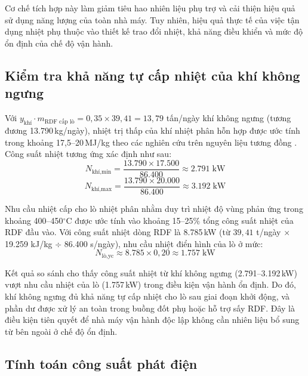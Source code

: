 \documentclass[../main.tex]{subfiles}
\begin{document}
Cơ chế tích hợp này làm giảm tiêu hao nhiên liệu phụ trợ và cải thiện hiệu quả sử dụng năng lượng của toàn nhà máy. Tuy nhiên, hiệu quả thực tế của việc tận dụng nhiệt phụ thuộc vào thiết kế trao đổi nhiệt, khả năng điều khiển và mức độ ổn định của chế độ vận hành.

\subsection{Kiểm tra khả năng tự cấp nhiệt của khí không ngưng}

Với $y_{\text{khí}} \cdot m_{\text{RDF cấp lò}} = 0{,}35 \times 39{,}41 = 13{,}79$ tấn/ngày khí không ngưng (tương đương 13.790\,kg/ngày), nhiệt trị thấp của khí nhiệt phân hỗn hợp được ước tính trong khoảng 17,5--20\,MJ/kg theo các nghiên cứu trên nguyên liệu tương đồng \cite{Williams2007}. Công suất nhiệt tương ứng xác định như sau:
\begin{equation}
  N_{\text{khí,min}} = \frac{13.790 \times 17.500}{86.400} \approx 2.791 \;\text{kW}
\end{equation}
\begin{equation}
  N_{\text{khí,max}} = \frac{13.790 \times 20.000}{86.400} \approx 3.192 \;\text{kW}
\end{equation}

Nhu cầu nhiệt cấp cho lò nhiệt phân nhằm duy trì nhiệt độ vùng phản ứng trong khoảng 400--450$^\circ\mathrm{C}$ được ước tính vào khoảng 15--25\% tổng công suất nhiệt của RDF đầu vào. Với công suất nhiệt dòng RDF là 8.785\,kW (từ $39{,}41$ t/ngày $\times$ 19.259 kJ/kg $\div$ 86.400 s/ngày), nhu cầu nhiệt điển hình của lò ở mức:
\begin{equation}
  N_{\text{lò,yc}} \approx 8.785 \times 0{,}20 \approx 1.757 \;\text{kW}
\end{equation}

Kết quả so sánh cho thấy công suất nhiệt từ khí không ngưng (2.791--3.192\,kW) vượt nhu cầu nhiệt của lò (1.757\,kW) trong điều kiện vận hành ổn định. Do đó, khí không ngưng đủ khả năng tự cấp nhiệt cho lò sau giai đoạn khởi động, và phần dư được xử lý an toàn trong buồng đốt phụ hoặc hỗ trợ sấy RDF. Đây là điều kiện tiên quyết để nhà máy vận hành độc lập không cần nhiên liệu bổ sung từ bên ngoài ở chế độ ổn định.

\subsection{Tính toán công suất phát điện}
\end{document}
